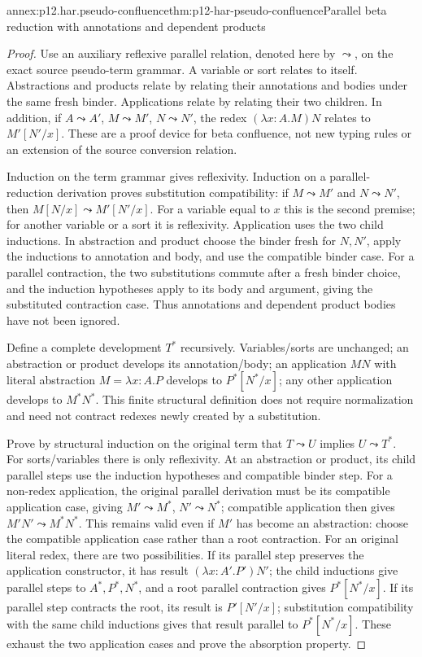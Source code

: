 \begin{annexitem}{annex:p12.har.pseudo-confluence}{thm:p12-har-pseudo-confluence}{Parallel beta reduction with annotations and dependent products}
\begin{proof}
Use an auxiliary reflexive parallel relation, denoted here by
\(\leadsto\), on the exact source pseudo-term grammar. A variable
or sort relates to itself. Abstractions and products relate by relating
their annotations and bodies under the same fresh binder. Applications
relate by relating their two children. In addition, if
\(A\leadsto A'\), \(M\leadsto M'\),
\(N\leadsto N'\), the redex
\((\lambda x:A.M)N\) relates to \(M'[N'/x]\).
These are a proof device for beta confluence, not new typing rules or an
extension of the source conversion relation.

Induction on the term grammar gives reflexivity. Induction on a
parallel-reduction derivation proves substitution compatibility:
if \(M\leadsto M'\) and \(N\leadsto N'\), then
\(M[N/x]\leadsto M'[N'/x]\). For a variable equal to \(x\)
this is the second premise; for another variable or a sort it is
reflexivity. Application uses the two child inductions. In abstraction
and product choose the binder fresh for \(N,N'\), apply the
inductions to annotation and body, and use the compatible binder case.
For a parallel contraction, the two substitutions commute after a
fresh binder choice, and the induction hypotheses apply to its body
and argument, giving the substituted contraction case. Thus annotations
and dependent product bodies have not been ignored.

Define a complete development \(T^*\) recursively. Variables/sorts
are unchanged; an abstraction or product develops its annotation/body;
an application \(MN\) with literal abstraction
\(M=\lambda x:A.P\) develops to \(P^*[N^*/x]\); any other
application develops to \(M^*N^*\). This finite structural definition
does not require normalization and need not contract redexes newly
created by a substitution.

Prove by structural induction on the original term that
\(T\leadsto U\) implies \(U\leadsto T^*\).
For sorts/variables there is only reflexivity. At an abstraction or
product, its child parallel steps use the induction hypotheses and
compatible binder step. For a non-redex application, the original
parallel derivation must be its compatible application case, giving
\(M'\leadsto M^*\), \(N'\leadsto N^*\); compatible application
then gives \(M'N'\leadsto M^*N^*\). This remains valid even if
\(M'\) has become an abstraction: choose the compatible application
case rather than a root contraction. For an original literal redex,
there are two possibilities. If its parallel step preserves the
application constructor, it has result
\((\lambda x:A'.P')N'\); the child inductions give parallel
steps to \(A^*,P^*,N^*\), and a root parallel contraction gives
\(P^*[N^*/x]\). If its parallel step contracts the root, its
result is \(P'[N'/x]\); substitution compatibility with the same
child inductions gives that result parallel to \(P^*[N^*/x]\).
These exhaust the two application cases and prove the absorption property.


\end{proof}
\end{annexitem}
